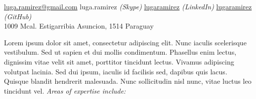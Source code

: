 \documentclass[10pt,a4paper]{article} %
\begin{document}
 



\noindent\href{mailto:luga.ramirez@gmail.com}{luga.ramirez@gmail.com}
\bull luga.ramirez \textit{(Skype)}
\bull \href{https://www.linkedin.com/in/lugaramirez/}{lugaramirez} \textit{(LinkedIn)}
\bull \href{https://github.com/lugaramirez}{lugaramirez} \textit{(GitHub)}\\
1009 Mcal. Estigarribia
\bull Asuncion, 1514
\bull Paraguay %

\spacedhrule{0.9em}{-0.4em} %



Lorem ipsum dolor sit amet, consectetur adipiscing elit. Nunc iaculis scelerisque vestibulum. Sed ut sapien et dui mollis condimentum. Phasellus enim lectus, dignissim vitae velit sit amet, porttitor tincidunt lectus. Vivamus adipiscing volutpat lacinia. Sed dui ipsum, iaculis id facilisis sed, dapibus quis lacus. Quisque blandit hendrerit malesuada. Nunc sollicitudin nisl nunc, vitae luctus leo tincidunt vel. \textit{Areas of expertise include:}

\vspace{-1em} %
\begin{multicols}{2}  %
{}
\end{multicols}

\spacedhrule{0.5em}{-0.4em} %
\end{document}
